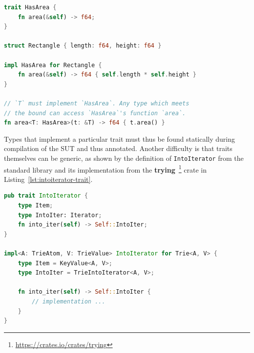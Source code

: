 \documentclass{article}
\begin{document}
\begin{lstlisting}[language=Rust, style=boxed, caption={A function that takes a generic types and specifies a bound}, label=lst:trait-bounds-example]
trait HasArea {
    fn area(&self) -> f64;
}

struct Rectangle { length: f64, height: f64 }

impl HasArea for Rectangle {
    fn area(&self) -> f64 { self.length * self.height }
}

// `T` must implement `HasArea`. Any type which meets
// the bound can access `HasArea`'s function `area`.
fn area<T: HasArea>(t: &T) -> f64 { t.area() }
\end{lstlisting}

Types that implement a particular trait must thus be found statically during compilation of the \ac{SUT} and thus annotated. Another difficulty is that traits themselves can be generic, as shown by the definition of \lstinline{IntoIterator} from the standard library and its implementation from the \textbf{trying}~\footnote{\url{https://crates.io/crates/trying}} crate in Listing~\ref{lst:intoiterator-trait}.

\begin{lstlisting}[language=Rust, style=boxed, caption={IntoIterator implementation in the \textbf{trying} crate}, label=lst:intoiterator-trait]
pub trait IntoIterator {
    type Item;
    type IntoIter: Iterator;
    fn into_iter(self) -> Self::IntoIter;
}

impl<A: TrieAtom, V: TrieValue> IntoIterator for Trie<A, V> {
    type Item = KeyValue<A, V>;
    type IntoIter = TrieIntoIterator<A, V>;

    fn into_iter(self) -> Self::IntoIter {
        // implementation ...
    }
}
\end{lstlisting}
\end{document}
